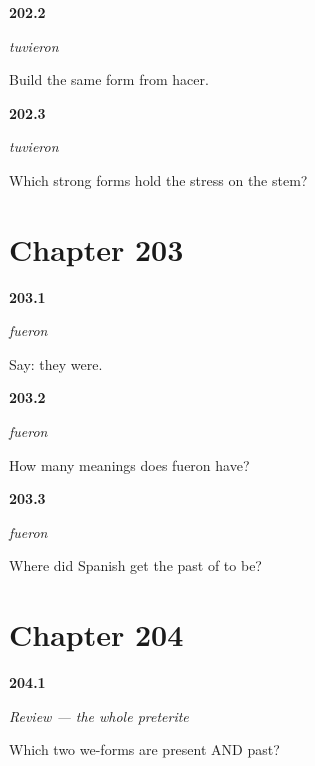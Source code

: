 \noindent\begin{minipage}[t]{\linewidth}
\raggedright
\hypertarget{review-ES-C55-tuvieron-build}{\textbf{202.2}} \emph{tuvieron}\par
\small Build the same form from hacer.
\end{minipage}\par\medskip

\noindent\begin{minipage}[t]{\linewidth}
\raggedright
\hypertarget{review-ES-C55-tuvieron-stress}{\textbf{202.3}} \emph{tuvieron}\par
\small Which strong forms hold the stress on the stem?
\end{minipage}\par\medskip

\section*{Chapter 203}

\noindent\begin{minipage}[t]{\linewidth}
\raggedright
\hypertarget{review-ES-C55-fueron-say}{\textbf{203.1}} \emph{fueron}\par
\small Say: they were.
\end{minipage}\par\medskip

\noindent\begin{minipage}[t]{\linewidth}
\raggedright
\hypertarget{review-ES-C55-fueron-two}{\textbf{203.2}} \emph{fueron}\par
\small How many meanings does fueron have?
\end{minipage}\par\medskip

\noindent\begin{minipage}[t]{\linewidth}
\raggedright
\hypertarget{review-ES-C55-fueron-why}{\textbf{203.3}} \emph{fueron}\par
\small Where did Spanish get the past of to be?
\end{minipage}\par\medskip

\section*{Chapter 204}

\noindent\begin{minipage}[t]{\linewidth}
\raggedright
\hypertarget{review-ES-C55-repaso-preterito-both}{\textbf{204.1}} \emph{Review — the whole preterite}\par
\small Which two we-forms are present AND past?
\end{minipage}\par\medskip

